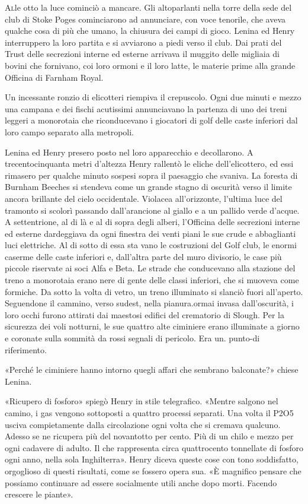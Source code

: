 \documentclass[
a5paper, %
10pt, %
twoside, 
onecolumn, %
openany, %
]{memoir}
\begin{document}
\lettrine{A}lle otto la luce cominciò a mancare. Gli altoparlanti nella torre della sede del club di Stoke Poges cominciarono ad annunciare, con voce tenorile, che aveva qualche cosa di più che umano, la chiusura dei campi di gioco. Lenina ed Henry interruppero la loro partita e si avviarono a piedi verso il club. Dai prati del Trust delle secrezioni interne ed esterne arrivava il muggito delle migliaia di bovini che fornivano, coi loro ormoni e il loro latte, le materie prime alla grande Officina di Farnham Royal.

Un incessante ronzio di elicotteri riempiva il crepuscolo. Ogni due minuti e mezzo una campana e dei fischi acutissimi annunciavano la partenza di uno dei treni leggeri a monorotaia che riconducevano i giocatori di golf delle caste inferiori dal loro campo separato alla metropoli.

Lenina ed Henry presero posto nel loro apparecchio e decollarono. A trecentocinquanta metri d’altezza Henry rallentò le eliche dell’elicottero, ed essi rimasero per qualche minuto sospesi sopra il paesaggio che svaniva. La foresta di Burnham Beeches si stendeva come un grande stagno di oscurità verso il limite ancora brillante del cielo occidentale. Violacea all’orizzonte, l’ultima luce del tramonto si scolorì passando dall’arancione al giallo e a un pallido verde d’acque. A settentrione, al di là e al di sopra degli alberi, l’Officina delle secrezioni interne ed esterne dardeggiava da ogni finestra dei venti piani le sue crude e abbaglianti luci elettriche. Al di sotto di essa sta vano le costruzioni del Golf club, le enormi caserme delle caste inferiori e, dall’altra parte del muro divisorio, le case più piccole riservate ai soci Alfa e Beta. Le strade che conducevano alla stazione del treno a monorotaia erano nere di gente delle classi inferiori, che si muoveva come formiche. Da sotto la volta di vetro, un treno illuminato si slanciò fuori all’aperto. Seguendone il cammino, verso sudest, nella pianura.ormai invasa dall’oscurità, i loro occhi furono attirati dai maestosi edifici del crematorio di Slough. Per la sicurezza dei voli notturni, le sue quattro alte ciminiere erano illuminate a giorno e coronate sulla sommità da rossi segnali di pericolo. Era un. punto-di riferimento.

«Perché le ciminiere hanno intorno quegli affari che sembrano balconate?» chiese Lenina.

«Ricupero di fosforo» spiegò Henry in stile telegrafico. «Mentre salgono nel camino, i gas vengono sottoposti a quattro processi separati. Una volta il P2O5 usciva compietamente dalla circolazione ogni volta che si cremava qualcuno. Adesso se ne ricupera più del novantotto per cento. Più di un chilo e mezzo per ogni cadavere di adulto. Il che rappresenta circa quattrocento tonnellate di fosforo ogni anno, nella sola Inghilterra». Henry diceva queste cose con tono soddisfatto, orgoglioso di questi risultati, come se fossero opera sua. «È magnifico pensare che possiamo continuare ad essere socialmente utili anche dopo morti. Facendo crescere le piante».
\end{document}
